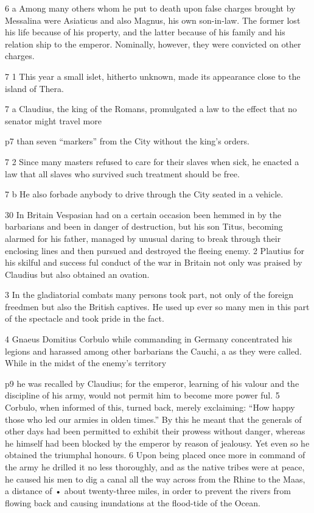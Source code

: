 6 a Among many others whom he put to death upon false charges brought by Messalina were Asiaticus and also Magnus, his own son-in\texthebrew{‑}law. The former lost his life because of his property, and the latter because of his family and his relation ­ship to the emperor. Nominally, however, they were convicted on other charges.

7 1 This year a small islet, hitherto unknown, made its appearance close to the island of Thera.

7 a
Claudius, the king of the Romans, promulgated a law to the effect that no senator might travel more

p7 than seven ``markers'' from the City without the king's orders.

7 2 Since many masters refused to care for their slaves when sick, he enacted a law that all slaves who survived such treatment should be free.

7 b
He also forbade anybody to drive through the City seated in a vehicle.

30
In Britain Vespasian had on a certain occasion been hemmed in by the barbarians and been in danger of destruction, but his son Titus, becoming alarmed for his father, managed by unusual daring to break through their enclosing lines and then pursued and destroyed the fleeing enemy. 2 Plautius for his skilful and success ­ful conduct of the war in Britain not only was praised by Claudius but also obtained an ovation.

3
In the gladiatorial combats many persons took part, not only of the foreign freedmen but also the British captives. He used up ever so many men in this part of the spectacle and took pride in the fact.

4
Gnaeus Domitius Corbulo while commanding in Germany concentrated his legions and harassed among other barbarians the Cauchi,\texthebrew{⁠} a as they were called. While in the midst of the enemy's territory

p9 he was recalled by Claudius; for the emperor, learning of his valour and the discipline of his army, would not permit him to become more power ­ful. 5 Corbulo, when informed of this, turned back, merely exclaiming: ``How happy those who led our armies in olden times.'' By this he meant that the generals of other days had been permitted to exhibit their prowess without danger, whereas he himself had been blocked by the emperor by reason of jealousy. Yet even so he obtained the triumphal honours. 6 Upon being placed once more in command of the army he drilled it no less thoroughly, and as the native tribes were at peace, he caused his men to dig a canal all the way across from the Rhine to the Maas, a distance of \texthebrew{•} about twenty-three miles, in order to prevent the rivers from flowing back and causing inundations at the flood-tide of the Ocean.

